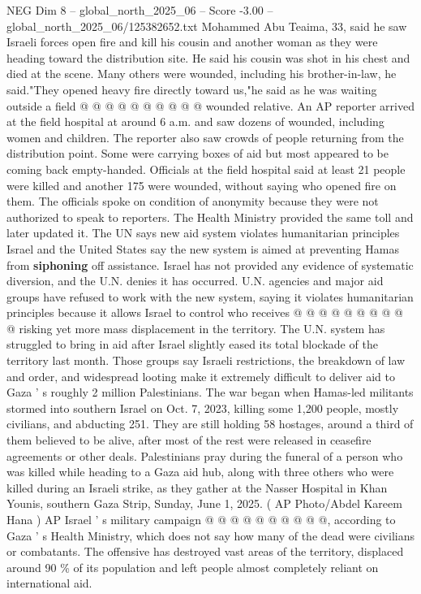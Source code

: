 \begin{textsample}{NEG Dim 8 – global\_north\_2025\_06 – Score -3.00 – global\_north\_2025\_06/125382652.txt}
Mohammed Abu Teaima, 33, said he saw Israeli forces open fire and kill his cousin and another woman as they were heading toward the distribution site.
He said his cousin was shot in his chest and died at the scene.
Many others were wounded, including his brother-in-law, he said."They opened heavy fire directly toward us,"he said as he was waiting outside a field @ @ @ @ @ @ @ @ @ @ wounded relative.
An AP reporter arrived at the field hospital at around 6 a.m. and saw dozens of wounded, including women and children.
The reporter also saw crowds of people returning from the distribution point.
Some were carrying boxes of aid but most appeared to be coming back empty-handed.
Officials at the field hospital said at least 21 people were killed and another 175 were wounded, without saying who opened fire on them.
The officials spoke on condition of anonymity because they were not authorized to speak to reporters.
The Health Ministry provided the same toll and later updated it.
The UN says new aid system violates humanitarian principles Israel and the United States say the new system is aimed at preventing Hamas from \textbf{siphoning} off assistance.
Israel has not provided any evidence of systematic diversion, and the U.N. denies it has occurred.
U.N. agencies and major aid groups have refused to work with the new system, saying it violates humanitarian principles because it allows Israel to control who receives @ @ @ @ @ @ @ @ @ @ risking yet more mass displacement in the territory.
The U.N. system has struggled to bring in aid after Israel slightly eased its total blockade of the territory last month.
Those groups say Israeli restrictions, the breakdown of law and order, and widespread looting make it extremely difficult to deliver aid to Gaza ' s roughly 2 million Palestinians.
The war began when Hamas-led militants stormed into southern Israel on Oct. 7, 2023, killing some 1,200 people, mostly civilians, and abducting 251.
They are still holding 58 hostages, around a third of them believed to be alive, after most of the rest were released in ceasefire agreements or other deals.
Palestinians pray during the funeral of a person who was killed while heading to a Gaza aid hub, along with three others who were killed during an Israeli strike, as they gather at the Nasser Hospital in Khan Younis, southern Gaza Strip, Sunday, June 1, 2025. ( AP Photo/Abdel Kareem Hana ) AP Israel ' s military campaign @ @ @ @ @ @ @ @ @ @, according to Gaza ' s Health Ministry, which does not say how many of the dead were civilians or combatants.
The offensive has destroyed vast areas of the territory, displaced around 90 \% of its population and left people almost completely reliant on international aid.

\end{textsample}

